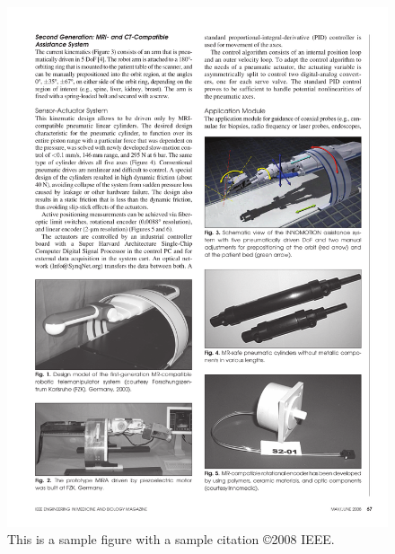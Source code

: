 \begin{figure}[h]
  \begin{center}
    \includegraphics[width=120mm]{Fig/chap1/innomotion.pdf}
  \end{center}
  \vspace{-4mm}
\caption[CAD model of the Innomotion robotic system.]
{This is a sample figure with a sample citation \cite{Fischer2008_TMECH} \copyright 2008 IEEE.}
 \label{fig:exampleFigure}
\vspace{-2mm}
\end{figure}

